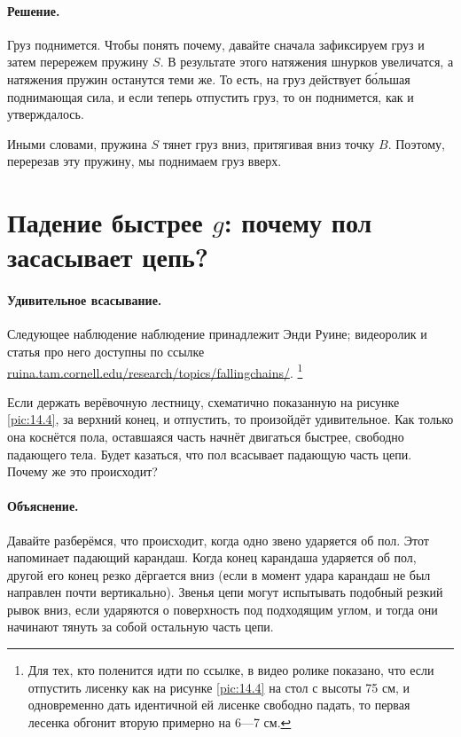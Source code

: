 \paragraph{Решение.}
Груз поднимется.
Чтобы понять почему, давайте сначала зафиксируем груз и затем перережем пружину $S$.
В результате этого натяжения шнурков увеличатся, а натяжения пружин останутся теми же.
То есть, на груз действует б\'{о}льшая поднимающая сила, и если теперь отпустить груз, то он поднимется, как и утверждалось.

Иными словами, пружина $S$ тянет груз вниз, притягивая вниз точку $B$.
Поэтому, перерезав эту пружину, мы поднимаем груз вверх.

\section{Падение быстрее $g$: почему пол засасывает цепь?}

\paragraph{Удивительное всасывание.}
Следующее наблюдение наблюдение принадлежит Энди Руине;
видеоролик и статья про него доступны по ссылке
\href{http://ruina.tam.cornell.edu/research/topics/fallingchains/}{ruina.tam.cornell.edu/research/topics/fallingchains/}.%
\footnote{Для тех, кто поленится идти по ссылке, в видео ролике показано, что если отпустить лисенку как на рисунке \ref{pic:14.4} на стол с высоты 75 см, и одновременно дать идентичной ей лисенке свободно падать, то первая лесенка обгонит вторую примерно на 6---7 см.\pr}

Если держать верёвочную лестницу, схематично показанную на рисунке \ref{pic:14.4}, за верхний конец, и отпустить, то произойдёт удивительное.
Как только она коснётся пола, оставшаяся часть начнёт двигаться быстрее, свободно падающего тела.
Будет казаться, что пол всасывает падающую часть цепи.
Почему же это происходит?

\paragraph{Объяснение.}
Давайте разберёмся, что происходит, когда одно звено ударяется об пол.
Этот напоминает падающий карандаш.
Когда конец карандаша ударяется об пол, другой его конец резко дёргается вниз (если в момент удара  карандаш не был направлен почти вертикально).
Звенья цепи могут испытывать подобный резкий рывок вниз, если ударяются о поверхность под подходящим углом, и тогда они начинают тянуть за собой остальную часть цепи.

